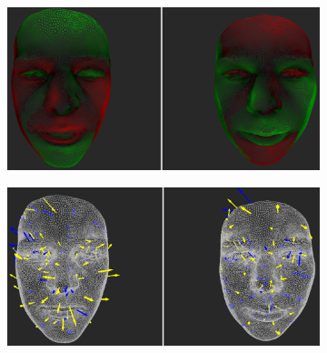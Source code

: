 \begin{figure}[h]
\centering
\begin{subfigure}{0.4\textwidth}
\includegraphics[width=\textwidth]{./screenshots/pair12.PNG}
\caption{}
\label{fig:study-4-12}
\end{subfigure}
\quad
\begin{subfigure}{0.4\textwidth}
\includegraphics[width=\textwidth]{./screenshots/pair14.PNG}
\caption{}
\label{fig:study-4-14}
\end{subfigure}


\end{figure}
